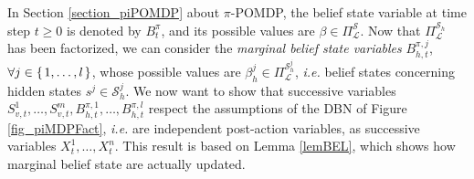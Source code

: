 In Section \ref{section_piPOMDP} about $\pi$-POMDP, 
the belief state variable 
at time step $t \geqslant 0$ 
is denoted by $B^{\pi}_{t}$,
and its possible values are $\beta \in \Pi^{\mathcal{S}}_{\mathcal{L}}$.
Now that $\Pi^{\mathcal{S}_h}_{\mathcal{L}}$ has been factorized,
we can consider the \textit{marginal belief state variables}
$B^{\pi,j}_{h,t}$, $\forall j \in \left\{ \left. 1,\ldots,l \right. \right\}$, 
whose possible values are $\beta_h^j \in \Pi^{\mathcal{S}^j_h}_{\mathcal{L}}$,
\textit{i.e.} belief states concerning hidden states $s^j \in \mathcal{S}^j_h$.
We now want to show that successive variables 
$S^1_{v,t},\ldots,S^m_{v,t},B^{\pi,1}_{h,t},\ldots,B^{\pi,l}_{h,t}$
respect the assumptions of the DBN of
Figure \ref{fig_piMDPFact},
\textit{i.e.} are independent post-action variables,
as successive variables $X^1_t, \ldots, X^n_t$.
This result is based on Lemma
\ref{lemBEL}, which shows how marginal belief state are actually updated. 
 


